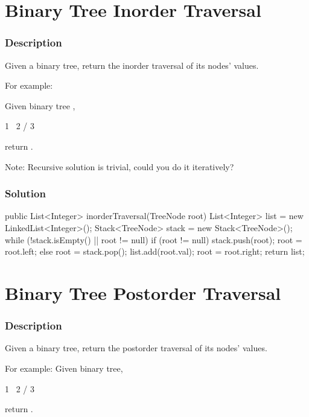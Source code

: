 \newpage

\section{Binary Tree Inorder Traversal} %

\subsubsection{Description}
Given a binary tree, return the inorder traversal of its nodes' values.

For example:

Given binary tree \code{[1,null,2,3]},
\begin{Code}
   1
    \
     2
    /
   3
\end{Code}

return \code{[1,3,2]}.

Note: Recursive solution is trivial, could you do it iteratively?

\subsubsection{Solution}

\begin{Code}
public List<Integer> inorderTraversal(TreeNode root) {
    List<Integer> list = new LinkedList<Integer>();
    Stack<TreeNode> stack = new Stack<TreeNode>();
    while (!stack.isEmpty() || root != null) {
        if (root != null) {
            stack.push(root);
            root = root.left;
        } else {
            root = stack.pop();
            list.add(root.val);
            root = root.right;
        }
    }
    return list;
}
\end{Code}

\newpage

\section{Binary Tree Postorder Traversal} %

\subsubsection{Description}
Given a binary tree, return the postorder traversal of its nodes' values.

For example:
Given binary tree,
\begin{Code}
   1
    \
     2
    /
   3
\end{Code}
return \code{[3,2,1]}.

